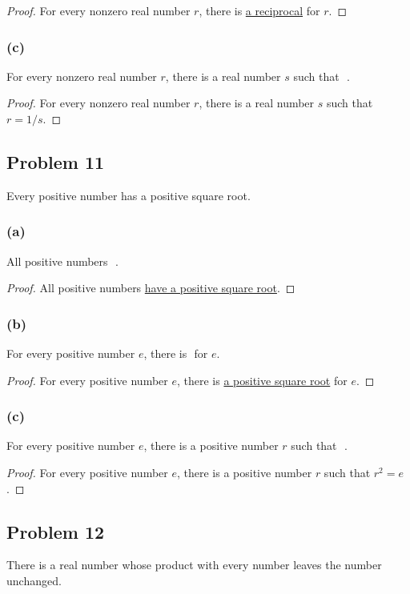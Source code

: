 \documentclass[14pt]{extarticle}
\newcommand{\fbl}{\underline{\hspace{1cm}}\,\,}
\begin{document}
\begin{proof}
For every nonzero real number $r$, there is \underline{a reciprocal} for $r$.
\end{proof}

\subsubsection{(c)}
For every nonzero real number $r$, there is a real number $s$ such that \fbl.

\begin{proof}
For every nonzero real number $r$, there is a real number $s$ such that
\underline{$r = 1/s$}.
\end{proof}

\subsection{Problem 11}
Every positive number has a positive square root.

\subsubsection{(a)}
All positive numbers \fbl.

\begin{proof}
All positive numbers \underline{have a positive square root}.
\end{proof}

\subsubsection{(b)}
For every positive number $e$, there is \fbl for $e$.

\begin{proof}
For every positive number $e$, there is \underline{a positive square root} for
$e$.
\end{proof}

\subsubsection{(c)}
For every positive number $e$, there is a positive number $r$ such that \fbl.

\begin{proof}
For every positive number $e$, there is a positive number $r$ such that
\underline{$r^2 = e$}.
\end{proof}

\subsection{Problem 12}
There is a real number whose product with every number leaves the number
unchanged.
\end{document}
